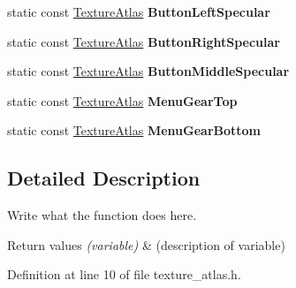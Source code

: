 \begin{DoxyCompactItemize}
\item 
\hypertarget{classTextureAtlas_a43bdce582ca4245f963415cbce11de63}{static const \hyperlink{classTextureAtlas}{Texture\+Atlas} {\bfseries Button\+Left\+Specular}}\label{classTextureAtlas_a43bdce582ca4245f963415cbce11de63}

\item 
\hypertarget{classTextureAtlas_aba9ac7217c6089808af6739280ec7779}{static const \hyperlink{classTextureAtlas}{Texture\+Atlas} {\bfseries Button\+Right\+Specular}}\label{classTextureAtlas_aba9ac7217c6089808af6739280ec7779}

\item 
\hypertarget{classTextureAtlas_acc26c58bb000ae76c00d1ea32c98dc15}{static const \hyperlink{classTextureAtlas}{Texture\+Atlas} {\bfseries Button\+Middle\+Specular}}\label{classTextureAtlas_acc26c58bb000ae76c00d1ea32c98dc15}

\item 
\hypertarget{classTextureAtlas_a5cd1596a9c97776e0c1f417567700668}{static const \hyperlink{classTextureAtlas}{Texture\+Atlas} {\bfseries Menu\+Gear\+Top}}\label{classTextureAtlas_a5cd1596a9c97776e0c1f417567700668}

\item 
\hypertarget{classTextureAtlas_a94b67c9b1a5f697574cc17b269575db7}{static const \hyperlink{classTextureAtlas}{Texture\+Atlas} {\bfseries Menu\+Gear\+Bottom}}\label{classTextureAtlas_a94b67c9b1a5f697574cc17b269575db7}

\end{DoxyCompactItemize}


\subsection{Detailed Description}
Write what the function does here. 


\begin{DoxyRetVals}{Return values}
{\em (variable)} & (description of variable) \\
\hline
\end{DoxyRetVals}


Definition at line 10 of file texture\+\_\+atlas.\+h.



